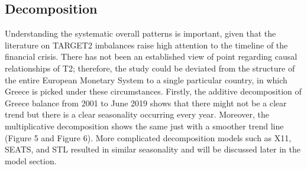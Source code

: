\documentclass[12pt]{article}
\begin{document}
\subsection{Decomposition}
Understanding the systematic overall patterns is important, given that the literature on TARGET2 imbalances raise high attention to the timeline of the financial crisis. There has not been an established view of point regarding causal relationships of T2; therefore, the study could be deviated from the structure of the entire European Monetary System to a single particular country, in which Greece is picked under these circumstances. Firstly, the additive decomposition of Greece balance from 2001 to June 2019 shows that there might not be a clear trend but there is a clear seasonality occurring every year. Moreover, the multiplicative decomposition shows the same just with a smoother trend line (Figure 5 and Figure 6). More complicated decomposition models such as X11, SEATS, and STL resulted in similar seasonality and will be discussed later in the model section. 
\end{document}

